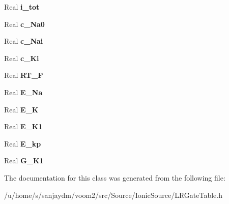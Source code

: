 \begin{DoxyCompactItemize}
\item 
\hypertarget{class_luo_rudy_gate_table_a251d6e727bba7657ac596c48cdac5ac0}{
Real {\bfseries i\_\-tot}}
\label{class_luo_rudy_gate_table_a251d6e727bba7657ac596c48cdac5ac0}

\item 
\hypertarget{class_luo_rudy_gate_table_a746142ec4c204d1a2fcd98ca1a7e570c}{
Real {\bfseries c\_\-Na0}}
\label{class_luo_rudy_gate_table_a746142ec4c204d1a2fcd98ca1a7e570c}

\item 
\hypertarget{class_luo_rudy_gate_table_a6554584f67e796b5100a671c1bcfb9ae}{
Real {\bfseries c\_\-Nai}}
\label{class_luo_rudy_gate_table_a6554584f67e796b5100a671c1bcfb9ae}

\item 
\hypertarget{class_luo_rudy_gate_table_a196360d980f5188b542e2b8ebeb70a0e}{
Real {\bfseries c\_\-Ki}}
\label{class_luo_rudy_gate_table_a196360d980f5188b542e2b8ebeb70a0e}

\item 
\hypertarget{class_luo_rudy_gate_table_a13239521e5056c1fd560c657eecb57e4}{
Real {\bfseries RT\_\-F}}
\label{class_luo_rudy_gate_table_a13239521e5056c1fd560c657eecb57e4}

\item 
\hypertarget{class_luo_rudy_gate_table_a18449666ba0bd4490fda2c5c79122bfd}{
Real {\bfseries E\_\-Na}}
\label{class_luo_rudy_gate_table_a18449666ba0bd4490fda2c5c79122bfd}

\item 
\hypertarget{class_luo_rudy_gate_table_a32cf328029420b482fd6fae9eeae660d}{
Real {\bfseries E\_\-K}}
\label{class_luo_rudy_gate_table_a32cf328029420b482fd6fae9eeae660d}

\item 
\hypertarget{class_luo_rudy_gate_table_a37897a0fae6854f3656c1b16f073b001}{
Real {\bfseries E\_\-K1}}
\label{class_luo_rudy_gate_table_a37897a0fae6854f3656c1b16f073b001}

\item 
\hypertarget{class_luo_rudy_gate_table_aa4bdeffdd714f090b8f99bb7ccf3dd27}{
Real {\bfseries E\_\-kp}}
\label{class_luo_rudy_gate_table_aa4bdeffdd714f090b8f99bb7ccf3dd27}

\item 
\hypertarget{class_luo_rudy_gate_table_ad477af94a9c0bb451123c86d7a1b6c0f}{
Real {\bfseries G\_\-K1}}
\label{class_luo_rudy_gate_table_ad477af94a9c0bb451123c86d7a1b6c0f}

\end{DoxyCompactItemize}


The documentation for this class was generated from the following file:\begin{DoxyCompactItemize}
\item 
/u/home/s/sanjaydm/voom2/src/Source/IonicSource/LRGateTable.h\end{DoxyCompactItemize}
